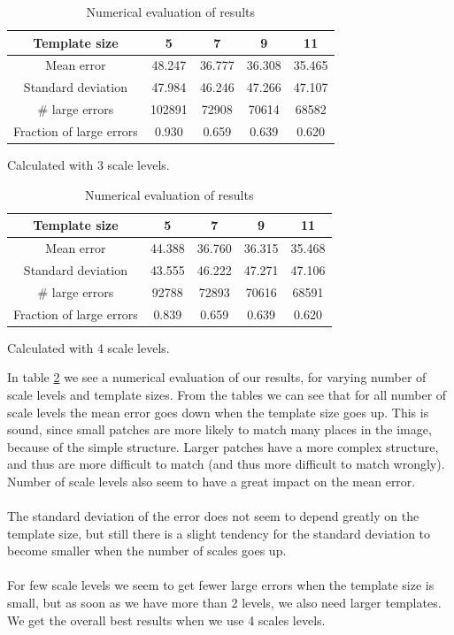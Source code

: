 \documentclass[12pt,a4paper,oneside,final]{article}
\begin{document}
\begin{table}[H]
\begin{subtable}{1\textwidth}
\begin{tabular}{c||c|c|c|c}
			Template size &5&7&9&11\\\hline
			Mean error &48.247&36.777&36.308&35.465\\\hline
			Standard deviation &47.984&46.246&47.266&47.107\\\hline
			\# large errors &102891&72908&70614&68582\\\hline
			Fraction of large errors &0.930&0.659&0.639&0.620\\\hline
		\end{tabular}
		\caption{Calculated with 3 scale levels.}
	\end{subtable}
	\begin{subtable}{1\textwidth}
		\centering
		\begin{tabular}{c||c|c|c|c}
			Template size &5&7&9&11\\\hline
			Mean error &44.388&36.760&36.315&35.468\\\hline
			Standard deviation &43.555&46.222&47.271&47.106\\\hline
			\# large errors &92788&72893&70616&68591\\\hline
			Fraction of large errors &0.839&0.659&0.639&0.620\\\hline
		\end{tabular}
		\caption{Calculated with 4 scale levels.}
	\end{subtable}
	\caption{Numerical evaluation of results}
	\label{tab:numeval}
\end{table}
In table \ref{tab:numeval} we see a numerical evaluation of our results, for varying number of scale levels and template sizes. From the tables we can see that for all number of scale levels the mean error goes down when the template size goes up. This is sound, since small patches are more likely to match many places in the image, because of the simple structure. Larger patches have a more complex structure, and thus are more difficult to match (and thus more difficult to match wrongly). Number of scale levels also seem to have a great impact on the mean error.\\\\
The standard deviation of the error does not seem to depend greatly on the template size, but still there is a slight tendency for the standard deviation to become smaller when the number of scales goes up.\\\\
For few scale levels we seem to get fewer large errors when the template size is small, but as soon as we have more than 2 levels, we also need larger templates. We get the overall best results when we use 4 scales levels. \\\\
\end{document}
